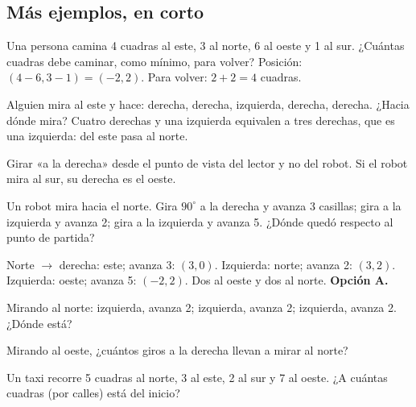\subsection{Más ejemplos, en corto}
\begin{ejemplo}
Una persona camina 4 cuadras al este, 3 al norte, 6 al oeste y 1 al sur. ¿Cuántas cuadras debe caminar, como mínimo, para
volver?
\solucion Posición: $(4 - 6, 3 - 1) = (-2, 2)$. Para volver: $2 + 2 = 4$ cuadras.
\end{ejemplo}

\begin{ejemplo}
Alguien mira al este y hace: derecha, derecha, izquierda, derecha, derecha. ¿Hacia dónde mira?
\solucion Cuatro derechas y una izquierda equivalen a tres derechas, que es una izquierda: del este pasa al norte.
\end{ejemplo}

\begin{trampa}
Girar «a la derecha» desde el punto de vista del lector y no del robot. Si el robot mira al sur, su derecha es el oeste.
\end{trampa}

\begin{reto}
Un robot mira hacia el norte. Gira $90^\circ$ a la derecha y avanza 3 casillas; gira a la izquierda y avanza 2; gira a la
izquierda y avanza 5. ¿Dónde quedó respecto al punto de partida?
\end{reto}

\begin{retoresuelto}
Norte $\to$ derecha: este; avanza 3: $(3, 0)$. Izquierda: norte; avanza 2: $(3, 2)$. Izquierda: oeste; avanza 5:
$(-2, 2)$. Dos al oeste y dos al norte. \textbf{Opción A.}
\end{retoresuelto}

\taller
{}
\begin{ejercicios}
\item Mirando al norte: izquierda, avanza 2; izquierda, avanza 2; izquierda, avanza 2. ¿Dónde está? 
\item Mirando al oeste, ¿cuántos giros a la derecha llevan a mirar al norte? 
\end{ejercicios}
\begin{ejercicios}
\item Un taxi recorre 5 cuadras al norte, 3 al este, 2 al sur y 7 al oeste. ¿A cuántas cuadras (por calles) está del inicio?
\end{ejercicios}

